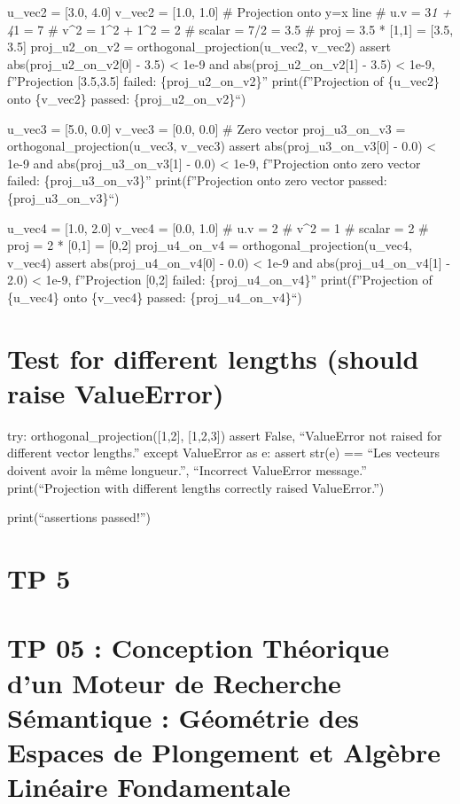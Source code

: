 \documentclass[11pt,a4paper]{report}
\begin{document}
u\_vec2 = {[}3.0, 4.0{]} v\_vec2 = {[}1.0, 1.0{]} \# Projection onto y=x
line \# u.v = 3\emph{1 + 4}1 = 7 \#
\textbar\textbar v\textbar\textbar\^{}2 = 1\^{}2 + 1\^{}2 = 2 \# scalar
= 7/2 = 3.5 \# proj = 3.5 * {[}1,1{]} = {[}3.5, 3.5{]} proj\_u2\_on\_v2
= orthogonal\_projection(u\_vec2, v\_vec2) assert
abs(proj\_u2\_on\_v2{[}0{]} - 3.5) \textless{} 1e-9 and
abs(proj\_u2\_on\_v2{[}1{]} - 3.5) \textless{} 1e-9, f''Projection
{[}3.5,3.5{]} failed: \{proj\_u2\_on\_v2\}'' print(f''Projection of
\{u\_vec2\} onto \{v\_vec2\} passed: \{proj\_u2\_on\_v2\}``)

u\_vec3 = {[}5.0, 0.0{]} v\_vec3 = {[}0.0, 0.0{]} \# Zero vector
proj\_u3\_on\_v3 = orthogonal\_projection(u\_vec3, v\_vec3) assert
abs(proj\_u3\_on\_v3{[}0{]} - 0.0) \textless{} 1e-9 and
abs(proj\_u3\_on\_v3{[}1{]} - 0.0) \textless{} 1e-9, f''Projection onto
zero vector failed: \{proj\_u3\_on\_v3\}'' print(f''Projection onto zero
vector passed: \{proj\_u3\_on\_v3\}``)

u\_vec4 = {[}1.0, 2.0{]} v\_vec4 = {[}0.0, 1.0{]} \# u.v = 2 \#
\textbar\textbar v\textbar\textbar\^{}2 = 1 \# scalar = 2 \# proj = 2 *
{[}0,1{]} = {[}0,2{]} proj\_u4\_on\_v4 = orthogonal\_projection(u\_vec4,
v\_vec4) assert abs(proj\_u4\_on\_v4{[}0{]} - 0.0) \textless{} 1e-9 and
abs(proj\_u4\_on\_v4{[}1{]} - 2.0) \textless{} 1e-9, f''Projection
{[}0,2{]} failed: \{proj\_u4\_on\_v4\}'' print(f''Projection of
\{u\_vec4\} onto \{v\_vec4\} passed: \{proj\_u4\_on\_v4\}``)

\hypertarget{test-for-different-lengths-should-raise-valueerror}{%
\section{Test for different lengths (should raise
ValueError)}\label{test-for-different-lengths-should-raise-valueerror}}

try: orthogonal\_projection({[}1,2{]}, {[}1,2,3{]}) assert False,
``ValueError not raised for different vector lengths.'' except
ValueError as e: assert str(e) == ``Les vecteurs doivent avoir la même
longueur.'', ``Incorrect ValueError message.'' print(``Projection with
different lengths correctly raised ValueError.'')

print(``\nAll assertions passed!'')


\section*{TP 5}
\hypertarget{tp-05-conception-thuxe9orique-dun-moteur-de-recherche-suxe9mantique-guxe9omuxe9trie-des-espaces-de-plongement-et-alguxe8bre-linuxe9aire-fondamentale}{%
\section{TP 05 : Conception Théorique d'un Moteur de Recherche
Sémantique : Géométrie des Espaces de Plongement et Algèbre Linéaire
Fondamentale}\label{tp-05-conception-thuxe9orique-dun-moteur-de-recherche-suxe9mantique-guxe9omuxe9trie-des-espaces-de-plongement-et-alguxe8bre-linuxe9aire-fondamentale}}
\end{document}

